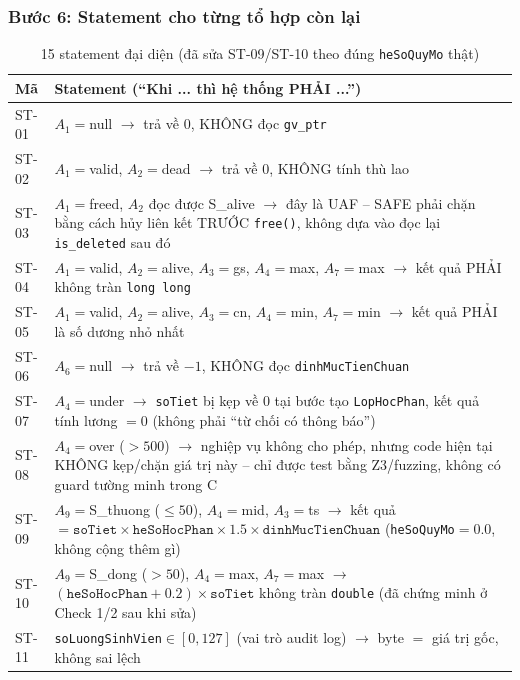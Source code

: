 \subsubsection*{Bước 6: Statement cho từng tổ hợp còn lại}

\begin{table}[H]
  \centering
  \caption{15 statement đại diện (đã sửa ST-09/ST-10 theo đúng \texttt{heSoQuyMo} thật)}
  \label{tab:statements}
  \footnotesize
  \renewcommand{\arraystretch}{1.2}
  \begin{tabularx}{\linewidth}{@{}l X@{}}
    \toprule
    \textbf{Mã} & \textbf{Statement (``Khi ... thì hệ thống PHẢI ...'')} \\
    \midrule
    ST-01 & $A_1{=}$null $\to$ trả về $0$, KHÔNG đọc \texttt{gv\_ptr} \\
    ST-02 & $A_1{=}$valid, $A_2{=}$dead $\to$ trả về $0$, KHÔNG tính thù lao \\
    ST-03 & $A_1{=}$freed, $A_2$ đọc được S\_alive $\to$ đây là UAF -- SAFE phải chặn bằng cách hủy liên kết TRƯỚC \texttt{free()}, không dựa vào đọc lại \texttt{is\_deleted} sau đó \\
    ST-04 & $A_1{=}$valid, $A_2{=}$alive, $A_3{=}$gs, $A_4{=}$max, $A_7{=}$max $\to$ kết quả PHẢI không tràn \texttt{long long} \\
    ST-05 & $A_1{=}$valid, $A_2{=}$alive, $A_3{=}$cn, $A_4{=}$min, $A_7{=}$min $\to$ kết quả PHẢI là số dương nhỏ nhất \\
    ST-06 & $A_6{=}$null $\to$ trả về $-1$, KHÔNG đọc \texttt{dinhMucTienChuan} \\
    ST-07 & $A_4{=}$under $\to$ \texttt{soTiet} bị kẹp về $0$ tại bước tạo \texttt{LopHocPhan}, kết quả tính lương $=0$ (không phải ``từ chối có thông báo'') \\
    ST-08 & $A_4{=}$over ($>500$) $\to$ nghiệp vụ không cho phép, nhưng code hiện tại KHÔNG kẹp/chặn giá trị này -- chỉ được test bằng Z3/fuzzing, không có guard tường minh trong C \\
    ST-09 & $A_9{=}$S\_thuong ($\le 50$), $A_4{=}$mid, $A_3{=}$ts $\to$ kết quả $=\texttt{soTiet}\times\texttt{heSoHocPhan}\times1.5\times\texttt{dinhMucTienChuan}$ (\texttt{heSoQuyMo}$=0.0$, không cộng thêm gì) \\
    ST-10 & $A_9{=}$S\_dong ($>50$), $A_4{=}$max, $A_7{=}$max $\to$ $(\texttt{heSoHocPhan}+0.2)\times\texttt{soTiet}$ không tràn \texttt{double} (đã chứng minh ở Check 1/2 sau khi sửa) \\
    ST-11 & \texttt{soLuongSinhVien}$\in[0,127]$ (vai trò audit log) $\to$ byte $=$ giá trị gốc, không sai lệch \\

\end{tabularx}
\end{table}
